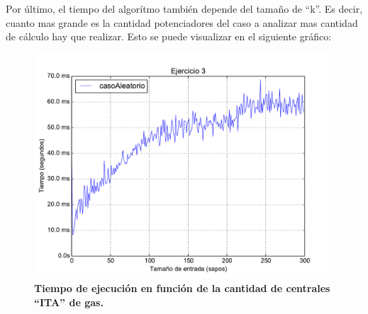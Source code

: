 \documentclass[11pt, a4paper, twoside]{article}
\begin{document}
Por último, el tiempo del algorítmo también depende del tamaño de ``k''. Es decir, cuanto mas grande es la cantidad potenciadores del caso a analizar mas cantidad de cálculo hay que realizar. Esto se puede visualizar en el siguiente gráfico:


\begin{figure}[H]
   \begin{center}
   \includegraphics[width=1.4\textwidth,angle=90]{../ej3/graficos/test_potExtra.pdf}
   \caption{\textbf{Tiempo de ejecución en función de la cantidad de centrales ``ITA'' de gas.}}
   \label{fig:ej3-graf-1}
   \end{center}
\end{figure}
\clearpage
\end{document}

